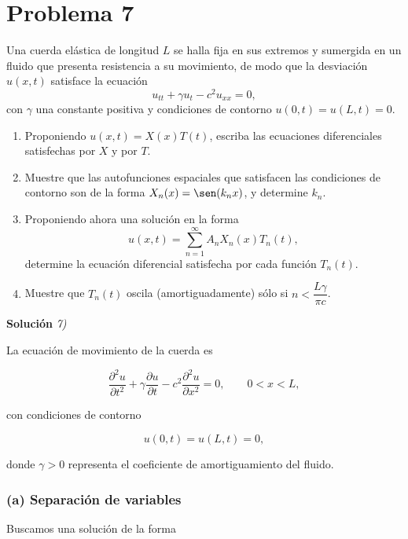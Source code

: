 \documentclass[12pt]{article}
\begin{document}
\section*{Problema 7}
Una cuerda elástica de longitud \(L\) se halla fija en sus extremos y sumergida en un fluido que presenta resistencia a su movimiento, de modo que la desviación \(u(x, t)\) satisface la ecuación
\[
u_{tt} + \gamma u_t - c^2 u_{xx} = 0,
\]
con \(\gamma\) una constante positiva y condiciones de contorno \(u(0,t) = u(L,t) = 0\).
\begin{enumerate}
    \item[(a)] Proponiendo \(u(x,t) = X(x)T(t)\), escriba las ecuaciones diferenciales satisfechas por \(X\) y por \(T\).
    \item[(b)] Muestre que las autofunciones espaciales que satisfacen las condiciones de contorno son de la forma \(X_n(x) = \sen(k_n x)\), y determine \(k_n\).
    \item[(c)] Proponiendo ahora una solución en la forma
    \[
    u(x, t) = \sum_{n=1}^{\infty} A_n X_n(x) T_n(t),
    \]
    determine la ecuación diferencial satisfecha por cada función \(T_n(t)\).
    \item[(d)] Muestre que \(T_n(t)\) oscila (amortiguadamente) sólo si \(n < \dfrac{L\gamma}{\pi c}\).
\end{enumerate}

\vspace{0.5cm}
{\bf Soluci\'on }{\em 7)}
\vspace{0.5cm}

La ecuación de movimiento de la cuerda es

\begin{equation}
\frac{\partial^2u}{\partial t^2}
+\gamma\frac{\partial u}{\partial t}
-c^2\frac{\partial^2u}{\partial x^2}=0,
\qquad
0<x<L,
\end{equation}

con condiciones de contorno

\begin{equation}
u(0,t)=u(L,t)=0,
\end{equation}

donde $\gamma>0$ representa el coeficiente de amortiguamiento del fluido.

\subsubsection*{(a) Separación de variables}

Buscamos una solución de la forma
\end{document}

